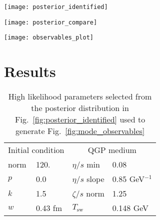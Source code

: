 \documentclass[aps,prc,reprint,amsmath]{revtex4-1}
\newcommand{\nch}{N_\text{ch}}
\begin{document}
\begin{figure*}
    \texttt{[image: posterior\_identified]}
    \caption{Diagonal and lower-diagonal: posterior marginal and joint distributions of the calibration parameters described in section \ref{?}. Diagonal entries show the posterior likelihood distribution of each parameter marginalized over remaining parameters, while lower-diagonal entries show the joint distribution of parameter pairs. Upper diagonal: the Pearson product-moment correlation coefficient $\rho_{X,Y}=\text{cov}(X,Y)/(\sigma_X \sigma_Y)$ for each pair of parameters $X$, $Y$. Red (blue) tiles indicate Pearson coefficients close to $1$ ($-1$) corresponding to strong linear correlation (anti-correlation). $^\dagger$The units for $\eta/s$ slope are [GeV$^{-1}$].}
    \label{fig:posterior_identified}
\end{figure*}

\begin{figure*}
    \texttt{[image: posterior\_compare]}
    \caption{Comparison of the posterior distributions obtained when the model is calibrated to fit identified pion, kaon and proton yields $dN/dy$ (blue lines), and when the model is calibrated to fit integrated charged particles $d\nch/d\eta$ (orange lines). $^\dagger$The units for $\eta/s$ slope are [GeV$^{-1}$].}
\end{figure*}

\begin{figure*}
    \texttt{[image: observables\_plot]}
    \caption{Identified yields (left column), mean $p_T$ (middle column) and flow cumulants $v_n\{2\}$ (right column). The top row shows results obtained from the training data used to condition the emulator. from 100 random samples drawn from the Bayesian posterior.}
\end{figure*}

\section{Results}

\begin{table}
    \caption{High likelihood parameters selected from the posterior distribution in Fig.~\ref{fig:posterior_identified} used to generate Fig.~\ref{fig:mode_observables}}
    \begin{ruledtabular}    
        \begin{tabular}{llll}
            \multicolumn{2}{c}{Initial condition} & \multicolumn{2}{c}{QGP medium} \\
            \noalign{\smallskip}\hline\noalign{\smallskip}
            norm & 120.          &  $\eta/s$ min   & 0.08       \\
            $p$  & 0.0           &  $\eta/s$ slope & 0.85 GeV$^{-1}$   \\
            $k$  & 1.5           &  $\zeta/s$ norm & 1.25       \\
            $w$  & 0.43 fm       &  $T_\text{sw}$  & 0.148 GeV  \\
        \end{tabular}
    \end{ruledtabular}
    \label{table:likely_param}
\end{table}
\end{document}
